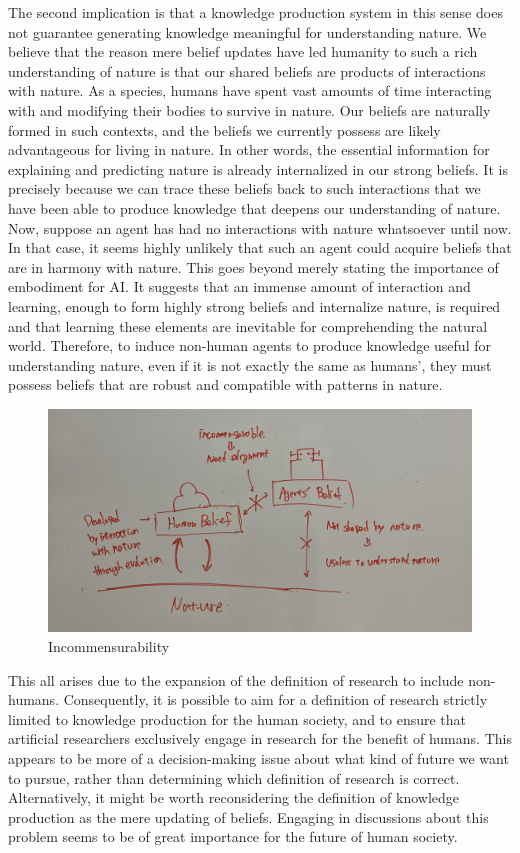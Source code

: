 \documentclass{book}
\begin{document}
The second implication is that a knowledge production system in this sense does not guarantee generating knowledge meaningful for understanding nature. We believe that the reason mere belief updates have led humanity to such a rich understanding of nature is that our shared beliefs are products of interactions with nature. As a species, humans have spent vast amounts of time interacting with and modifying their bodies to survive in nature. Our beliefs are naturally formed in such contexts, and the beliefs we currently possess are likely advantageous for living in nature. In other words, the essential information for explaining and predicting nature is already internalized in our strong beliefs. It is precisely because we can trace these beliefs back to such interactions that we have been able to produce knowledge that deepens our understanding of nature. Now, suppose an agent has had no interactions with nature whatsoever until now. In that case, it seems highly unlikely that such an agent could acquire beliefs that are in harmony with nature. This goes beyond merely stating the importance of embodiment for AI. It suggests that an immense amount of interaction and learning, enough to form highly strong beliefs and internalize nature, is required and that learning these elements are inevitable for comprehending the natural world. Therefore, to induce non-human agents to produce knowledge useful for understanding nature, even if it is not exactly the same as humans', they must possess beliefs that are robust and compatible with patterns in nature.

\begin{figure}[htb]
    \centering
    \includegraphics[width=\linewidth]{figs/incommensurability.jpg}
    \caption{Incommensurability}
    \label{fig:incommensurability}
\end{figure}

This all arises due to the expansion of the definition of research to include non-humans. Consequently, it is possible to aim for a definition of research strictly limited to knowledge production for the human society, and to ensure that artificial researchers exclusively engage in research for the benefit of humans. This appears to be more of a decision-making issue about what kind of future we want to pursue, rather than determining which definition of research is correct. Alternatively, it might be worth reconsidering the definition of knowledge production as the mere updating of beliefs. Engaging in discussions about this problem seems to be of great importance for the future of human society.
\end{document}

